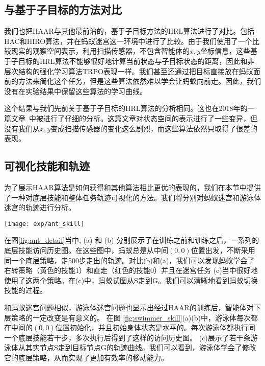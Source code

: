 \subsection{与基于子目标的方法对比} 

我们也把HAAR与其他最前沿的，基于子目标方法的HRL算法进行了对比。包括HAC和HIRO算法，并在蚂蚁迷宫这一环境中进行了比较。由于我们使用了一个比较现实的观察空间表示，利用扫描传感器，不包含智能体的$x, y$坐标信息，这些基于子目标的HRL算法不能够很好地计算当前状态与子目标状态的距离，因此和非层次结构的强化学习算法TRPO表现一样。我们甚至还通过把目标直接放在蚂蚁面前的方法来简化这个任务，但是这些算法依然难以学会让蚂蚁向前走。因此，我们没有在实验结果中保留这些算法的学习曲线。

这个结果与我们先前关于基于子目标的HRL算法的分析相同。这也在2018年的一篇文章~\cite{sensitive_to_goal_space}中被进行了仔细的分析。这篇文章对状态空间的表示进行了一些变异，但没有我们从$x, y$变成扫描传感器的变化这么剧烈，而这些算法依然只取得了很差的表现。

\subsection{可视化技能和轨迹}
\label{deeper}

为了展示HAAR算法是如何获得和其他算法相比更优的表现的，我们在本节中提供了一种对底层技能和整体任务轨迹可视化的方法。我们将分别对蚂蚁迷宫和游泳体迷宫的轨迹进行分析。

\begin{figure*}[htbp]
\centering
 \centering
    \texttt{[image: exp/ant\_skill]}
\caption{(a) 蚂蚁预训练底层技能的访问历史图。 (b) 蚂蚁在蚂蚁迷宫环境中训练过后的底层技能访问历史图。 (c) 训练过后，蚂蚁在蚂蚁迷宫环境中的两条示例轨迹。}
\label{fig:ant_detail}
\end{figure*}

在图\ref{fig:ant_detail}当中, (a) 和 (b) 分别展示了在训练之前和训练之后，一系列的底层技能访问历史图。在这些图中，蚂蚁总是从中间$(0, 0)$位置出发，不断采用同一个底层策略，走500步走出的轨迹。对比(b)和(a)，我们可以发现蚂蚁学会了右转策略（黄色的技能1）和直走（红色的技能0）并且在迷宫任务 (c)当中很好地使用了这两个策略。在(c)中，蚂蚁试图从S走到G。我们可以清晰地看到蚂蚁切换技能的过程。

和蚂蚁迷宫问题相似，游泳体迷宫问题也显示出经过HAAR的训练后，智能体对下层策略的一定改变是有意义的。
在图 \ref{fig:swimmer_skill}(a)(b)中，游泳体每次都在中间的$(0, 0)$位置初始化，并且初始身体状态是水平的。每次游泳体都执行同一个底层技能若干步，多次执行后得到了这样的访问历史图。 (c)展示了若干条游泳体从其实节点S走到目标节点G的轨迹曲线。我们可以看到，游泳体学会了修改它的底层策略，从而实现了更加有效率的移动能力。

